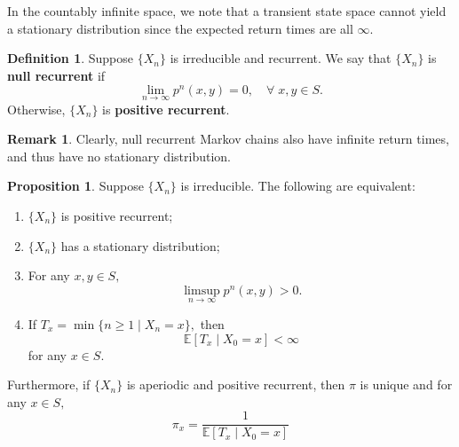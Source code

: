 \documentclass[10pt, oneside]{article}
\newcommand{\bbE}{\mathbb{E}}
\theoremstyle{definition}
\newtheorem{defn}{Definition}
\newtheorem{prop}{Proposition}
\newtheorem{rem}{Remark}
\begin{document}
In the countably infinite space, we note that a transient state space cannot yield a stationary distribution since the expected return times are all $\infty.$
\begin{defn}
    Suppose $\{X_n\}$ is irreducible and recurrent. We say that $\{X_n\}$ is \textbf{null recurrent} if 
    \[\lim_{n\to \infty}p^n(x,y)= 0, \quad \forall\; x,y \in S.\] Otherwise, $\{X_n\}$ is \textbf{positive recurrent}.
\end{defn}
\begin{rem}
    Clearly, null recurrent Markov chains also have infinite return times, and thus have no stationary distribution.
\end{rem}
\begin{prop}
    Suppose $\{X_n\}$ is irreducible. The following are equivalent:
    \begin{enumerate}
        \item $\{X_n\}$ is positive recurrent;
        \item $\{X_n\}$ has a stationary distribution;
        \item For any $x,y \in S,$ 
        \[\limsup_{n\to \infty} p^n(x,y) > 0.\]
        \item If $T_x = \min\{n \geq 1 \mid X_n = x\},$ then 
        \[\bbE[T_x \mid X_0 = x] < \infty\] for any $x \in S.$
    \end{enumerate}
    Furthermore, if $\{X_n\}$ is aperiodic and positive recurrent, then $\pi$ is unique and for any $x\in S,$
    \[\pi_x = \frac{1}{\bbE[T_x \mid X_0 = x]}\]
\end{prop}
\end{document}
